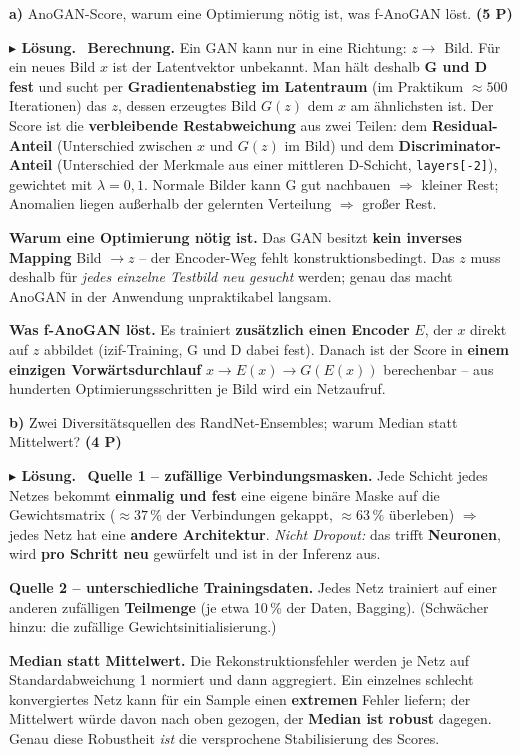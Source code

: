 \documentclass[10pt,a4paper]{article}
\newcommand{\pkt}[1]{\hfill\textbf{(#1 P)}}
\newenvironment{loes}%
  {\par\vspace{2pt}\begingroup\small\noindent\textbf{\color{loesfarbe}$\blacktriangleright$ Lösung.}\ }%
  {\endgroup\par\vspace{5pt}}
\begin{document}
\textbf{a)} AnoGAN-Score, warum eine Optimierung nötig ist, was f-AnoGAN löst. \pkt{5}

\begin{loes}
\textbf{Berechnung.} Ein GAN kann nur in eine Richtung: $z \to$ Bild. Für ein neues Bild $x$ ist
der Latentvektor unbekannt. Man hält deshalb \textbf{G und D fest} und sucht per
\textbf{Gradientenabstieg im Latentraum} (im Praktikum $\approx500$ Iterationen) das $z$, dessen
erzeugtes Bild $G(z)$ dem $x$ am ähnlichsten ist. Der Score ist die \textbf{verbleibende
Restabweichung} aus zwei Teilen: dem \textbf{Residual-Anteil} (Unterschied zwischen $x$ und $G(z)$
im Bild) und dem \textbf{Discriminator-Anteil} (Unterschied der Merkmale aus einer mittleren
D-Schicht, \texttt{layers[-2]}), gewichtet mit $\lambda = 0{,}1$. Normale Bilder kann G gut
nachbauen $\Rightarrow$ kleiner Rest; Anomalien liegen außerhalb der gelernten Verteilung
$\Rightarrow$ großer Rest.

\textbf{Warum eine Optimierung nötig ist.} Das GAN besitzt \textbf{kein inverses Mapping}
Bild $\to z$ -- der Encoder-Weg fehlt konstruktionsbedingt. Das $z$ muss deshalb für \emph{jedes
einzelne Testbild neu gesucht} werden; genau das macht AnoGAN in der Anwendung unpraktikabel
langsam.

\textbf{Was f-AnoGAN löst.} Es trainiert \textbf{zusätzlich einen Encoder} $E$, der $x$ direkt auf
$z$ abbildet (izif-Training, G und D dabei fest). Danach ist der Score in \textbf{einem einzigen
Vorwärtsdurchlauf} $x \to E(x) \to G(E(x))$ berechenbar -- aus hunderten Optimierungsschritten je
Bild wird ein Netzaufruf.
\end{loes}

\textbf{b)} Zwei Diversitätsquellen des RandNet-Ensembles; warum Median statt Mittelwert? \pkt{4}

\begin{loes}
\textbf{Quelle 1 -- zufällige Verbindungsmasken.} Jede Schicht jedes Netzes bekommt
\textbf{einmalig und fest} eine eigene binäre Maske auf die Gewichtsmatrix ($\approx37\,\%$ der
Verbindungen gekappt, $\approx63\,\%$ überleben) $\Rightarrow$ jedes Netz hat eine \textbf{andere
Architektur}. \emph{Nicht Dropout:} das trifft \textbf{Neuronen}, wird \textbf{pro Schritt neu}
gewürfelt und ist in der Inferenz aus.

\textbf{Quelle 2 -- unterschiedliche Trainingsdaten.} Jedes Netz trainiert auf einer anderen
zufälligen \textbf{Teilmenge} (je etwa 10\,\% der Daten, Bagging).
(Schwächer hinzu: die zufällige Gewichtsinitialisierung.)

\textbf{Median statt Mittelwert.} Die Rekonstruktionsfehler werden je Netz auf Standardabweichung 1
normiert und dann aggregiert. Ein einzelnes schlecht konvergiertes Netz kann für ein Sample einen
\textbf{extremen} Fehler liefern; der Mittelwert würde davon nach oben gezogen, der \textbf{Median
ist robust} dagegen. Genau diese Robustheit \emph{ist} die versprochene Stabilisierung des Scores.
\end{loes}
\end{document}
